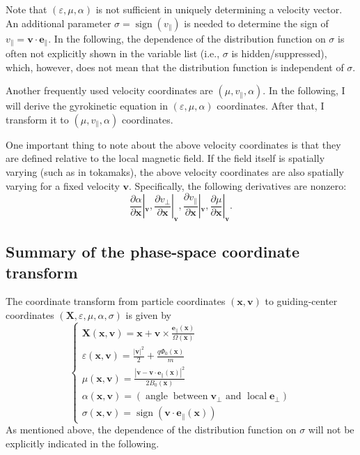 \documentclass{llncs}
\newcommand{\infixand}{\text{ and }}
\newcommand{\nobracket}{}
\newcommand{\tmmathbf}[1]{\ensuremath{\boldsymbol{#1}}}
\newcommand{\tmop}[1]{\ensuremath{\operatorname{#1}}}
\begin{document}
Note that $(\varepsilon, \mu, \alpha)$ is not sufficient in uniquely
determining a velocity vector. An additional parameter $\sigma = \tmop{sign}
(v_{\parallel})$ is needed to determine the sign of $v_{\parallel} =\mathbf{v}
\cdot \mathbf{e}_{\parallel}$. In the following, the dependence of the
distribution function on $\sigma$ is often not explicitly shown in the
variable list (i.e., $\sigma$ is hidden/suppressed), which, however, does not
mean that the distribution function is independent of $\sigma$.

Another frequently used velocity coordinates are $(\mu, v_{\parallel},
\alpha)$. In the following, I will derive the gyrokinetic equation in
$(\varepsilon, \mu, \alpha)$ coordinates. After that, I transform it to $(\mu,
v_{\parallel}, \alpha)$ coordinates.

One important thing to note about the above velocity coordinates is that they
are defined relative to the local magnetic field. If the field itself is
spatially varying (such as in tokamaks), the above velocity coordinates are
also spatially varying for a fixed velocity $\mathbf{v}$. Specifically, the
following derivatives are nonzero:
\begin{equation}
  \frac{\partial \alpha}{\partial \mathbf{x}} |_{\mathbf{v}} \nobracket,
  \frac{\partial v_{\perp}}{\partial \mathbf{x}} |_{\mathbf{v}} \nobracket,
  \frac{\partial v_{\parallel}}{\partial \mathbf{x}} |_{\mathbf{v}}
  \nobracket, \frac{\partial \mu}{\partial \mathbf{x}} |_{\mathbf{v}}
  \nobracket .
\end{equation}

\subsection{Summary of the phase-space coordinate transform}

The coordinate transform from particle coordinates $(\mathbf{x}, \mathbf{v})$
to guiding-center coordinates $(\mathbf{X}, \varepsilon, \mu, \alpha, \sigma)$
is given by
\begin{equation}
  \label{21-8-25-a1} \left\{\begin{array}{l}
    \mathbf{X} (\mathbf{x}, \mathbf{v}) =\mathbf{x}+\mathbf{v} \times
    \frac{\tmmathbf{e}_{\parallel} (\mathbf{x})}{\Omega (\mathbf{x})}\\
    \varepsilon (\mathbf{x}, \mathbf{v}) = \frac{| \mathbf{v} |^2}{2} +
    \frac{q \Phi_0 (\mathbf{x})}{m}\\
    \mu (\mathbf{x}, \mathbf{v}) = \frac{| \mathbf{v}-\mathbf{v} \cdot
    \mathbf{e}_{\parallel} (\mathbf{x}) |^2}{2 B_0 (\mathbf{x})}\\
    \alpha (\mathbf{x}, \mathbf{v}) = \left( \tmop{angle} \tmop{between}
    \mathbf{v}_{\perp} \infixand \tmop{local} \mathbf{e}_{\perp} \right)\\
    \sigma (\mathbf{x}, \mathbf{v}) = \tmop{sign} (\mathbf{v} \cdot
    \mathbf{e}_{\parallel} (\mathbf{x}))
  \end{array}\right.
\end{equation}
As mentioned above, the dependence of the distribution function on $\sigma$
will not be explicitly indicated in the following.
\end{document}
